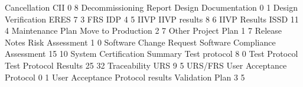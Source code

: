 \documentclass{article}
\begin{document}
\begin{Schunk}
\begin{Soutput}
                    Cancellation                              CII 
                               0                                8 
          Decommissioning Report             Design Documentation 
                               0                                1 
             Design Verification                             ERES 
                               7                                3 
                             FRS                              IDP 
                               4                                5 
                            IIVP                     IIVP results 
                               8                                6 
                    IIVP Results                             ISSD 
                              11                                4 
                Maintenance Plan               Move to Production 
                               2                                7 
                           Other                     Project Plan 
                               1                                7 
                   Release Notes                  Risk Assessment 
                               1                                0 
         Software Change Request   Software Compliance Assessment 
                              15                               10 
    System Certification Summary                    Test protocol 
                               8                                0 
                   Test Protocol            Test Protocol Results 
                              25                               32 
                    Traceability                              URS 
                               9                                5 
                         URS/FRS         User Acceptance Protocol 
                               0                                1 
User Acceptance Protocol results                  Validation Plan 
                               3                                5 
\end{Soutput}
\end{Schunk}
\end{document}
